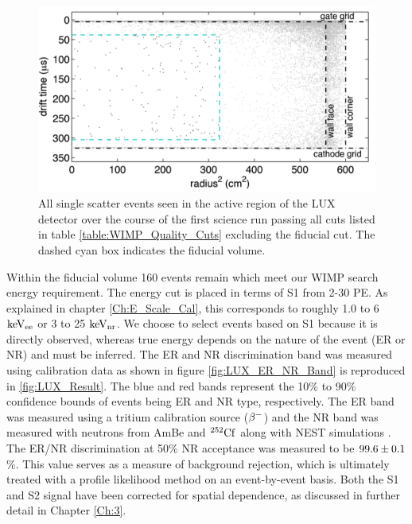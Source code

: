  \begin{figure}[h!]\centering
\includegraphics[width=130mm]{Chapter_LUX_Det/LUX_Result_Event.png}
\caption{All single scatter events seen in the active region of the LUX detector over the course of the first science run passing all cuts listed in table \ref{table:WIMP_Quality_Cuts} excluding the fiducial cut. The dashed cyan box indicates the fiducial volume.}
\label{fig:LUX_Result_Event}
\end{figure}

Within the fiducial volume 160 events remain which meet our WIMP search energy requirement. The energy cut is placed in terms of S1 from 2-30 PE. As explained in chapter \ref{Ch:E_Scale_Cal}, this corresponds to roughly 1.0 to 6 $\rm keV_{ee}$ or 3 to 25 $\rm keV_{nr}$. We choose to select events based on S1 because it is directly observed, whereas true energy depends on the nature of the event (ER or NR) and must be inferred. %
The ER and NR discrimination band was measured using calibration data as shown in figure \ref{fig:LUX_ER_NR_Band} is reproduced in \ref{fig:LUX_Result}. The blue and red bands represent the 10\% to 90\% confidence bounds of events being ER and NR type, respectively. The ER band was measured using a tritium calibration source ($\rm \beta^{-}$) and the NR band was measured with neutrons from AmBe and $\rm^{252}Cf$ along with NEST simulations \cite{NEST_2013}. The ER/NR discrimination at 50\% NR acceptance was measured to be $\rm 99.6\pm0.1$ \%. This value serves as a measure of background rejection, which is ultimately treated with a profile likelihood method on an event-by-event basis. Both the S1 and S2 signal have been corrected for spatial dependence, as discussed in further detail in Chapter \ref{Ch:3}. %

